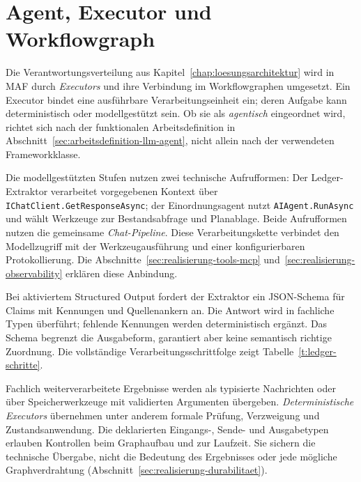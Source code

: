 \section{Agent, Executor und Workflowgraph}
\label{sec:realisierung-agent-executor-workflow}

Die Verantwortungsverteilung aus
Kapitel~\ref{chap:loesungsarchitektur} wird in MAF durch
\emph{Executors} und ihre Verbindung im Workflowgraphen umgesetzt.
Ein Executor bindet eine ausführbare Verarbeitungseinheit ein;
deren Aufgabe kann deterministisch oder modellgestützt sein. Ob
sie als \emph{agentisch} eingeordnet wird, richtet sich nach der
funktionalen Arbeitsdefinition in
Abschnitt~\ref{sec:arbeitsdefinition-llm-agent}, nicht allein nach
der verwendeten Frameworkklasse.

Die modellgestützten Stufen nutzen zwei technische Aufrufformen:
Der Ledger-Extraktor verarbeitet vorgegebenen Kontext über
\texttt{IChatClient.GetResponseAsync}; der Einordnungsagent nutzt
\texttt{AIAgent.RunAsync} und wählt Werkzeuge zur Bestandsabfrage
und Planablage. Beide Aufrufformen nutzen die gemeinsame
\emph{Chat-Pipeline}. Diese Verarbeitungskette verbindet den
Modellzugriff mit der Werkzeugausführung und einer konfigurierbaren
Protokollierung. Die Abschnitte~\ref{sec:realisierung-tools-mcp}
und~\ref{sec:realisierung-observability} erklären diese Anbindung.

Bei aktiviertem Structured Output fordert der Extraktor ein
JSON-Schema für Claims mit
Kennungen und Quellenankern an. Die Antwort wird in fachliche
Typen überführt; fehlende Kennungen werden deterministisch
ergänzt. Das Schema begrenzt die Ausgabeform, garantiert aber
keine semantisch richtige Zuordnung. Die vollständige
Verarbeitungsschrittfolge zeigt Tabelle~\ref{t:ledger-schritte}.

Fachlich weiterverarbeitete Ergebnisse werden als typisierte
Nachrichten oder über Speicherwerkzeuge mit validierten
Argumenten übergeben. \emph{Deterministische Executors} übernehmen
unter anderem formale Prüfung, Verzweigung und Zustandsanwendung.
Die deklarierten Eingangs-, Sende- und Ausgabetypen erlauben
Kontrollen beim Graphaufbau und zur Laufzeit. Sie sichern die
technische Übergabe, nicht die Bedeutung des Ergebnisses oder
jede mögliche Graphverdrahtung
(Abschnitt~\ref{sec:realisierung-durabilitaet}).

